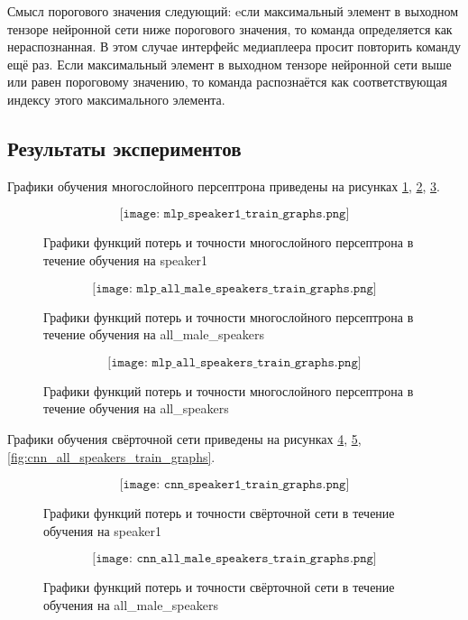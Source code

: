 Смысл порогового значения следующий: eсли максимальный элемент в выходном тензоре нейронной сети ниже порогового значения, то команда определяется как нераспознанная. В этом случае интерфейс медиаплеера просит повторить команду ещё раз. Если максимальный элемент в выходном тензоре нейронной сети выше или равен пороговому значению, то команда распознаётся как соответствующая индексу этого максимального элемента. 

\newpage
\subsection{Результаты экспериментов}
Графики обучения многослойного персептрона приведены на рисунках \ref{fig:mlp_speaker1_train_graphs}, \ref{fig:mlp_all_male_speakers_train_graphs}, \ref{fig:mlp_all_speakers_train_graphs}.

\begin{figure}[H]
	\[\texttt{[image: mlp\_speaker1\_train\_graphs.png]}\]
	\caption{Графики функций потерь и точности многослойного персептрона в течение обучения на speaker1}
	\label{fig:mlp_speaker1_train_graphs}
\end{figure}

\begin{figure}[H]
	\[\texttt{[image: mlp\_all\_male\_speakers\_train\_graphs.png]}\]
	\caption{Графики функций потерь и точности многослойного персептрона в течение обучения на all\_male\_speakers}
	\label{fig:mlp_all_male_speakers_train_graphs}
\end{figure}

\begin{figure}[H]
	\[\texttt{[image: mlp\_all\_speakers\_train\_graphs.png]}\]
	\caption{Графики функций потерь и точности многослойного персептрона в течение обучения на all\_speakers}
	\label{fig:mlp_all_speakers_train_graphs}
\end{figure}


Графики обучения свёрточной сети приведены на рисунках \ref{fig:cnn_speaker1_train_graphs}, \ref{fig:cnn_all_male_speakers_train_graphs}, \ref{fig:cnn_all_speakers_train_graphs}.

\begin{figure}[H]
	\[\texttt{[image: cnn\_speaker1\_train\_graphs.png]}\]
	\caption{Графики функций потерь и точности свёрточной сети в течение обучения на speaker1}
	\label{fig:cnn_speaker1_train_graphs}
\end{figure}

\begin{figure}[H]
	\[\texttt{[image: cnn\_all\_male\_speakers\_train\_graphs.png]}\]
	\caption{Графики функций потерь и точности свёрточной сети в течение обучения на all\_male\_speakers}
	\label{fig:cnn_all_male_speakers_train_graphs}
\end{figure}

